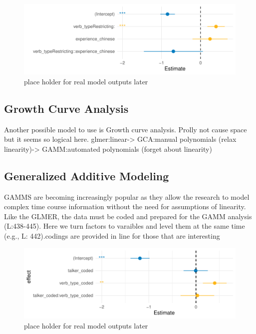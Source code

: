 \begin{figure}[h]
    \centering
    \includegraphics[width=\textwidth]{figures/GLMER_accent_model.pdf}
    \caption{place holder for real model outputs later}
    \label{fig:model_outputs}
\end{figure}

\subsection{Growth Curve Analysis}

Another possible model to use is Growth curve analysis. Prolly not cause space but it seems so logical here. glmer:linear-> GCA:manual polynomials (relax linearity)-> GAMM:automated polynomials (forget about linearity)


\subsection{Generalized Additive Modeling}

GAMMS are becoming increasingly popular as they allow the research to model complex time course information without the need for assumptions of linearity. Like the GLMER, the data must be coded and prepared for the GAMM analysis (L:438-445). Here we turn factors to varaibles and level them at the same time (e.g., L: 442).codings are provided in line for those that are interesting





\begin{figure}[h]
    \centering
    \includegraphics[width=\textwidth]{figures/model_gamm_effects.pdf}
    \caption{place holder for real model outputs later}
    \label{fig:model_outputs}
\end{figure}